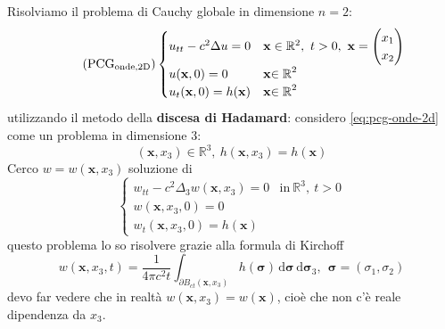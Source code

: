 \documentclass[10pt,a4paper,twoside,openright]{book}
\newcommand{\x}{\mathbf{x}}
\newcommand{\sigg}{\bm{\sigma}}
\newcommand{\de}{\,\mathrm d}
\newcommand{\dsig}{\de \sigg}
\begin{document}
Risolviamo il problema di Cauchy globale in dimensione $n=2$:
\begin{equation*}
    \tag{PCG$_{\text{onde,2D}}$}
    \begin{cases}
        u_{tt} -c^{2} \Delta u=0 & \x \in \mathbb{R}^{2} ,\ t >0,\ \x =
        \begin{pmatrix}
            x_{1} \\
            x_{2}
        \end{pmatrix}                                     \\
        u(\x ,0) =0              & \x\mathbb{\in R}^{2}                 \\
        u_{t}(\x ,0) =h(\x)      & \x\mathbb{\in R}^{2}
    \end{cases}
    \label{eq:pcg-onde-2d}
\end{equation*}
utilizzando il metodo della \textbf{discesa di Hadamard}: considero \eqref{eq:pcg-onde-2d} come un problema in dimensione $3$:
\begin{equation}
    (\x ,x_{3}) \in \mathbb{R}^{3} ,\ h(\x ,x_{3}) =h(\x)
\end{equation}
Cerco $\displaystyle w=w(\x ,x_{3})$ soluzione di
\begin{equation*}
    \begin{cases}
        w_{tt} -c^{2} \Delta _{3} w(\x ,x_{3}) =0 & \text{in} \ \mathbb{R}^{3} ,\ t >0 \\
        w(\x ,x_{3} ,0) =0                        &                                    \\
        w_{t}(\x ,x_{3} ,0) =h(\x)                &
    \end{cases}
\end{equation*}
questo problema lo so risolvere grazie alla formula di Kirchoff
\begin{equation*}
    w(\x ,x_{3} ,t) =\frac{1}{4\pi c^{2} t}\int _{\partial B_{ct}(\x ,x_{3})} h(\sigg) \dsig \dsig _{3} ,\ \ \sigg =(\sigma _{1} ,\sigma _{2})
\end{equation*}
devo far vedere che in realtà $\displaystyle w(\x ,x_{3}) =w(\x)$, cioè che non c'è reale dipendenza da $\displaystyle x_{3}$.
\end{document}
